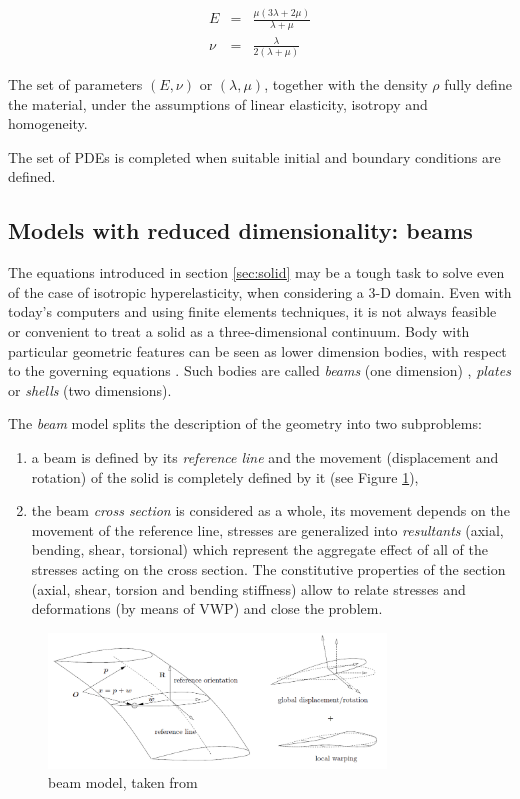 \begin{eqnarray}
	E &=& \frac{\mu(3\lambda+2\mu)}{\lambda + \mu} \\
	\nu &=& \frac{\lambda}{2(\lambda + \mu)}
\end{eqnarray}

The set of parameters $\left(E, \nu\right)$ or $\left(\lambda, \mu \right)$, together with the density $\rho$ fully define the material, under the assumptions of linear elasticity, isotropy and homogeneity.

The set of PDEs is completed when suitable initial and boundary conditions are defined.

\subsection{Models with reduced dimensionality: beams}
\label{sec:beam}

The equations introduced in section \ref{sec:solid} may be a tough task to solve even of the case of isotropic hyperelasticity, when considering a 3-D domain. Even with today's computers and using finite elements techniques, it is not always feasible or convenient to treat a solid as a three-dimensional continuum. Body with particular geometric features can be seen as lower dimension bodies, with respect to the governing equations \cite{hjelmstad2007fundamentals}. Such bodies are called \textit{beams} (one dimension) , \textit{plates} or \textit{shells} (two dimensions).

The \textit{beam} model splits the description of the geometry into two subproblems:
\begin{enumerate}
	\item a beam is defined by its \textit{reference line} and the movement (displacement and rotation) of the solid is completely defined by it (see Figure \ref{fig:beam-model}),
	\item the beam \textit{cross section} is considered as a whole, its movement depends on the movement of the reference line, stresses are generalized into \textit{resultants} (axial, bending, shear, torsional) which represent the aggregate effect of all of the stresses acting on the cross section. The constitutive properties of the section (axial, shear, torsion and bending stiffness) allow to relate stresses and deformations (by means of VWP) and close the problem.
\end{enumerate}


\begin{figure}[htbp!]
	\centering
	\includegraphics[width=0.8\textwidth]{images/beam}
	\caption{beam model, taken from \cite{ghiringhelli2008integrated}}
	\label{fig:beam-model}
\end{figure}


